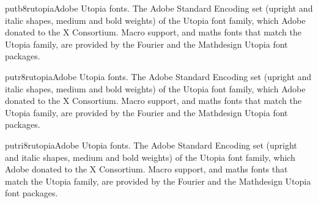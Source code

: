 \documentclass{ddltxtyp}
\begin{document}
\begin{package}{putb8r}{utopia}{Adobe Utopia fonts.}
The Adobe Standard Encoding set (upright and italic shapes,
medium and bold weights) of the Utopia font family, which Adobe
donated to the X Consortium. Macro support, and maths fonts
that match the Utopia family, are provided by the Fourier and
the Mathdesign Utopia font packages.
\end{package}
\begin{package}{putr8r}{utopia}{Adobe Utopia fonts.}
The Adobe Standard Encoding set (upright and italic shapes,
medium and bold weights) of the Utopia font family, which Adobe
donated to the X Consortium. Macro support, and maths fonts
that match the Utopia family, are provided by the Fourier and
the Mathdesign Utopia font packages.
\end{package}
\begin{package}{putri8r}{utopia}{Adobe Utopia fonts.}
The Adobe Standard Encoding set (upright and italic shapes,
medium and bold weights) of the Utopia font family, which Adobe
donated to the X Consortium. Macro support, and maths fonts
that match the Utopia family, are provided by the Fourier and
the Mathdesign Utopia font packages.
\end{package}
\end{document}
